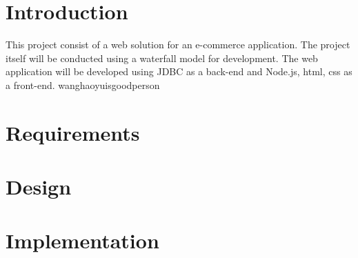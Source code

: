 \documentclass[12pt]{article}
\begin{document}
\begin{myspace}{1.7}
        
\section*{Introduction}  
This project consist of a web solution for an e-commerce application. The project itself will be conducted using a waterfall model\cite{waterfall} for development.  The web application will be developed using JDBC as a back-end and Node.js, html, css  as a front-end. wanghaoyuisgoodperson


%
%
\pagebreak
\section*{Requirements}  



%
%


\pagebreak
\section*{Design}


%
%
\pagebreak
\section*{Implementation}



\end{myspace}
\end{document}
